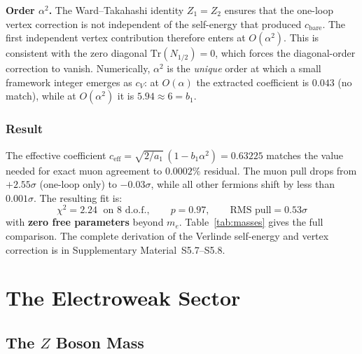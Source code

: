 \documentclass[12pt,a4paper]{article}
\theoremstyle{definition}
\begin{document}
\textbf{Order $\alpha^2$.}  The Ward--Takahashi identity $Z_1 = Z_2$ ensures that the one-loop vertex correction is not independent of the self-energy that produced $c_{\mathrm{bare}}$.  The first independent vertex contribution therefore enters at $O(\alpha^2)$.  This is consistent with the zero diagonal $\mathrm{Tr}(N_{1/2}) = 0$, which forces the diagonal-order correction to vanish.  Numerically, $\alpha^2$ is the \emph{unique} order at which a small framework integer emerges as $c_V$: at $O(\alpha)$ the extracted coefficient is $0.043$ (no match), while at $O(\alpha^2)$ it is $5.94 \approx 6 = b_1$.

\subsubsection*{Result}

The effective coefficient $c_{\mathrm{eff}} = \sqrt{2/a_1}\,(1 - b_1\alpha^2) = 0.63225$ matches the value needed for exact muon agreement to $0.0002\%$ residual.  The muon pull drops from $+2.55\sigma$ (one-loop only) to $-0.03\sigma$, while all other fermions shift by less than $0.001\sigma$.  The resulting fit is:
\begin{equation}
\chi^2 = 2.24 \;\text{ on 8 d.o.f.}, \qquad p = 0.97, \qquad \text{RMS pull} = 0.53\sigma
\label{eq:chi2_vertex}
\end{equation}
with \textbf{zero free parameters} beyond $m_e$.  Table~\ref{tab:masses} gives the full comparison.  The complete derivation of the Verlinde self-energy and vertex correction is in Supplementary Material~S5.7--S5.8.


\section{The Electroweak Sector}
\label{sec:ew}

\subsection{The \texorpdfstring{$Z$}{Z} Boson Mass}
\end{document}
